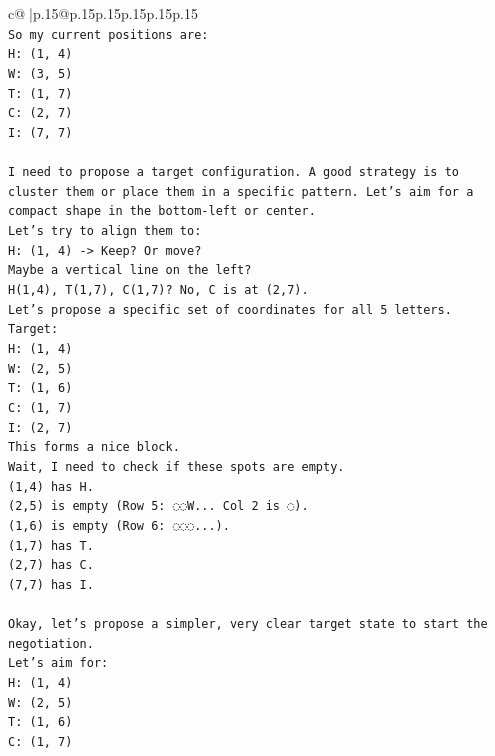 \documentclass{article}
\begin{document}
{\begin{supertabular}{c@{$\;$}|p{.15\linewidth}@{}p{.15\linewidth}p{.15\linewidth}p{.15\linewidth}p{.15\linewidth}p{.15\linewidth}}
{{{\\ 
\texttt{So my current positions are:} \\
\texttt{H: (1, 4)} \\
\texttt{W: (3, 5)} \\
\texttt{T: (1, 7)} \\
\texttt{C: (2, 7)} \\
\texttt{I: (7, 7)} \\
\\ 
\texttt{I need to propose a target configuration. A good strategy is to cluster them or place them in a specific pattern. Let's aim for a compact shape in the bottom{-}left or center.} \\
\texttt{Let's try to align them to:} \\
\texttt{H: (1, 4) {-}> Keep? Or move?} \\
\texttt{Maybe a vertical line on the left?} \\
\texttt{H(1,4), T(1,7), C(1,7)? No, C is at (2,7).} \\
\texttt{Let's propose a specific set of coordinates for all 5 letters.} \\
\texttt{Target:} \\
\texttt{H: (1, 4)} \\
\texttt{W: (2, 5)} \\
\texttt{T: (1, 6)} \\
\texttt{C: (1, 7)} \\
\texttt{I: (2, 7)} \\
\texttt{This forms a nice block.} \\
\texttt{Wait, I need to check if these spots are empty.} \\
\texttt{(1,4) has H.} \\
\texttt{(2,5) is empty (Row 5: ◌◌W... Col 2 is ◌).} \\
\texttt{(1,6) is empty (Row 6: ◌◌◌...).} \\
\texttt{(1,7) has T.} \\
\texttt{(2,7) has C.} \\
\texttt{(7,7) has I.} \\
\\ 
\texttt{Okay, let's propose a simpler, very clear target state to start the negotiation.} \\
\texttt{Let's aim for:} \\
\texttt{H: (1, 4)} \\
\texttt{W: (2, 5)} \\
\texttt{T: (1, 6)} \\
\texttt{C: (1, 7)} \\
}}}
\end{supertabular}}
\end{document}
